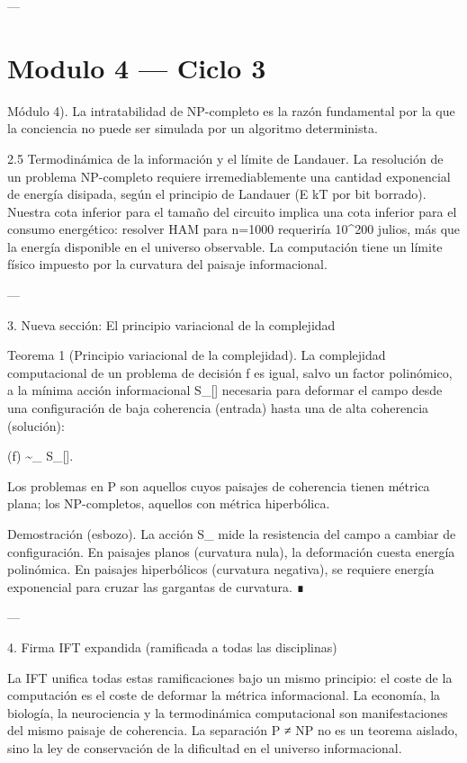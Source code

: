 \documentclass[12pt,twoside]{book}
\begin{document}
---




\chapter{Modulo 4 — Ciclo 3}
Módulo 4). La intratabilidad de NP-completo es la razón fundamental por la que la conciencia no puede ser simulada por un algoritmo determinista.

2.5 Termodinámica de la información y el límite de Landauer.
La resolución de un problema NP-completo requiere irremediablemente una cantidad exponencial de energía disipada, según el principio de Landauer (E \ge kT  por bit borrado). Nuestra cota inferior para el tamaño del circuito implica una cota inferior para el consumo energético: resolver HAM para n=1000 requeriría 10^{200} julios, más que la energía disponible en el universo observable. La computación tiene un límite físico impuesto por la curvatura del paisaje informacional.

---

3. Nueva sección: El principio variacional de la complejidad

Teorema 1 (Principio variacional de la complejidad). La complejidad computacional de un problema de decisión f es igual, salvo un factor polinómico, a la mínima acción informacional S_{}[\rho] necesaria para deformar el campo \rho desde una configuración de baja coherencia (entrada) hasta una de alta coherencia (solución):

(f) \sim \min_{\rho} S_{}[\rho].

Los problemas en P son aquellos cuyos paisajes de coherencia tienen métrica plana; los NP-completos, aquellos con métrica hiperbólica.

Demostración (esbozo). La acción S_{} mide la resistencia del campo a cambiar de configuración. En paisajes planos (curvatura nula), la deformación cuesta energía polinómica. En paisajes hiperbólicos (curvatura negativa), se requiere energía exponencial para cruzar las gargantas de curvatura. ∎

---

4. Firma IFT expandida (ramificada a todas las disciplinas)

La IFT unifica todas estas ramificaciones bajo un mismo principio: el coste de la computación es el coste de deformar la métrica informacional. La economía, la biología, la neurociencia y la termodinámica computacional son manifestaciones del mismo paisaje de coherencia. La separación P ≠ NP no es un teorema aislado, sino la ley de conservación de la dificultad en el universo informacional.
\end{document}
